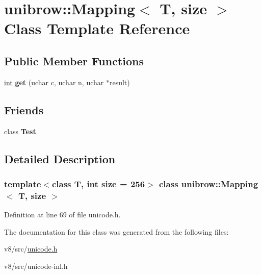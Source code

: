 \hypertarget{classunibrow_1_1Mapping}{}\section{unibrow\+:\+:Mapping$<$ T, size $>$ Class Template Reference}
\label{classunibrow_1_1Mapping}
\subsection*{Public Member Functions}
\begin{DoxyCompactItemize}
\item 
\mbox{\label{classunibrow_1_1Mapping_af188d9e55a5717b581e026969b33cd38}} 
\mbox{\hyperlink{classint}{int}} {\bfseries get} (uchar c, uchar n, uchar $\ast$result)
\end{DoxyCompactItemize}
\subsection*{Friends}
\begin{DoxyCompactItemize}
\item 
\mbox{\label{classunibrow_1_1Mapping_a5b78b1c2e1fa07ffed92da365593eaa4}} 
class {\bfseries Test}
\end{DoxyCompactItemize}


\subsection{Detailed Description}
\subsubsection*{template$<$class T, int size = 256$>$\newline
class unibrow\+::\+Mapping$<$ T, size $>$}



Definition at line 69 of file unicode.\+h.



The documentation for this class was generated from the following files\+:\begin{DoxyCompactItemize}
\item 
v8/src/\mbox{\hyperlink{unicode_8h}{unicode.\+h}}\item 
v8/src/unicode-\/inl.\+h\end{DoxyCompactItemize}
